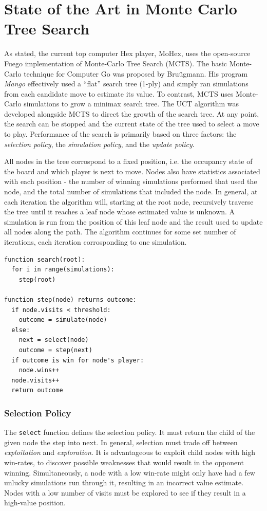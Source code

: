 \documentclass[10pt,a4paper]{report}
\begin{document}
\chapter{State of the Art in Monte Carlo Tree Search}\label{mcts}
As stated, the current top computer Hex player, MoHex, uses the open-source Fuego implementation of Monte-Carlo Tree Search (MCTS). The basic Monte-Carlo technique for Computer Go was proposed by Bru\"{u}gmann\cite{brugmann1993monte}. His program \emph{Mango} effectively used a ``flat'' search tree (1-ply) and simply ran simulations from each candidate move to estimate its value. To contrast, MCTS uses Monte-Carlo simulations to grow a minimax search tree. The UCT algorithm was developed alongside MCTS to direct the growth of the search tree\cite{gelly2006exploration}. At any point, the search can be stopped and the current state of the tree used to select a move to play. Performance of the search is primarily based on three factors: the \emph{selection policy}, the \emph{simulation policy}, and the \emph{update policy}.

All nodes in the tree corrospond to a fixed position, i.e. the occupancy state of the board and which player is next to move. Nodes also have statistics associated with each position - the number of winning simulations performed that used the node, and the total number of simulations that included the node. In general, at each iteration the algorithm will, starting at the root node, recursively traverse the tree until it reaches a leaf node whose estimated value is unknown. A simulation is run from the position of this leaf node and the result used to update all nodes along the path. The algorithm continues for some set number of iterations, each iteration corrosponding to one simulation.

\begin{verbatim}
function search(root):
  for i in range(simulations):
    step(root)
		
function step(node) returns outcome:
  if node.visits < threshold:
    outcome = simulate(node)
  else:
    next = select(node)
    outcome = step(next)
  if outcome is win for node's player:
    node.wins++
  node.visits++
  return outcome
\end{verbatim}

\subsection{Selection Policy}
The \texttt{select} function defines the selection policy. It must return the child of the given node the step into next. In general, selection must trade off between \emph{exploitation} and \emph{exploration}. It is advantageous to exploit child nodes with high win-rates, to discover possible weaknesses that would result in the opponent winning. Simultaneously, a node with a low win-rate might only have had a few unlucky simulations run through it, resulting in an incorrect value estimate. Nodes with a low number of visits must be explored to see if they result in a high-value position.
\end{document}
